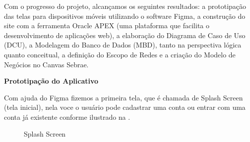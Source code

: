 Com o progresso do projeto, alcançamos os seguintes resultados: a prototipação das telas para dispositivos móveis utilizando o software Figma, a construção do site com a ferramenta Oracle APEX (uma plataforma que facilita o desenvolvimento de aplicações web), a elaboração do Diagrama de Caso de Uso (DCU), a Modelagem do Banco de Dados (MBD), tanto na perspectiva lógica quanto conceitual, a definição do Escopo de Redes e a criação do Modelo de Negócios no Canvas Sebrae.

\textbf{Prototipação do Aplicativo}

Com ajuda do Figma fizemos a primeira tela, que é chamada de Splash Screen (tela inicial), nela voce o usuário pode cadastrar uma conta ou entrar com uma conta já existente conforme ilustrado na .

\begin{figure}[H]
    \centering
    \caption{Splash Screen}%
    \label{phot:pg-2}

\end{figure}
